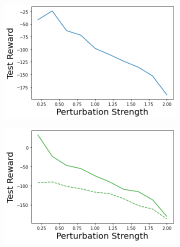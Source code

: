 \begin{figure}
\begin{subfigure}{.24\textwidth}
    \end{subfigure}
    \begin{subfigure}{.24\textwidth}
        \includegraphics[width=\textwidth]{sections/011_icml2022/resources/action_shift-DKL-LunarLanderShift-v0-mean_reward_.png}
    \end{subfigure}
    \begin{subfigure}{.24\textwidth}
        \includegraphics[width=\textwidth]{sections/011_icml2022/resources/action_shift-PostNet-LunarLanderShift-v0-mean_reward_.png}
    \end{subfigure}
    

\end{figure}
